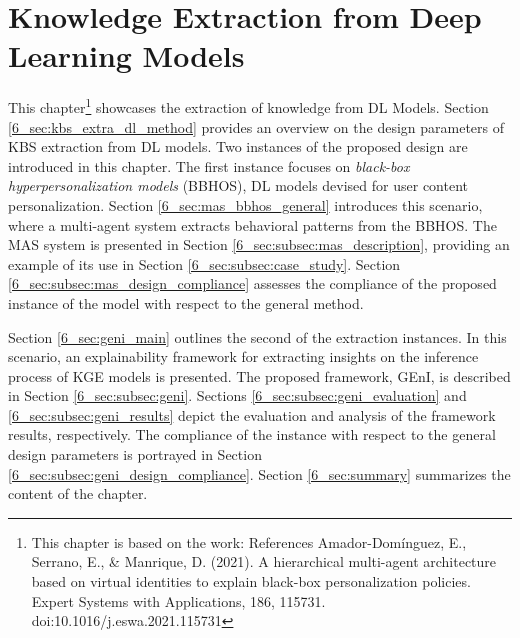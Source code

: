 \chapter{Knowledge Extraction from Deep Learning Models}
\label{chap:kbsextractiondl}
This chapter\footnote{This chapter is based on the work: References
Amador-Domínguez, E., Serrano, E., & Manrique, D. (2021). A hierarchical multi-agent architecture based on virtual identities to explain black-box personalization policies. Expert Systems with Applications, 186, 115731. doi:10.1016/j.eswa.2021.115731} showcases the extraction of knowledge from DL Models. Section \ref{6_sec:kbs_extra_dl_method} provides an overview on the design parameters of KBS extraction from DL models. Two instances of the proposed design are introduced in this chapter. The first instance focuses on \textit{black-box hyperpersonalization models} (BBHOS), DL models devised for user content personalization. Section \ref{6_sec:mas_bbhos_general} introduces this scenario, where a multi-agent system extracts behavioral patterns from the BBHOS. The MAS system is presented in Section \ref{6_sec:subsec:mas_description}, providing an example of its use in Section \ref{6_sec:subsec:case_study}. Section \ref{6_sec:subsec:mas_design_compliance} assesses the compliance of the proposed instance of the model with respect to the general method. 

Section \ref{6_sec:geni_main} outlines the second of the extraction instances. In this scenario, an explainability framework for extracting insights on the inference process of KGE models is presented. The proposed framework, GEnI, is described in Section \ref{6_sec:subsec:geni}. Sections \ref{6_sec:subsec:geni_evaluation} and \ref{6_sec:subsec:geni_results} depict the evaluation and analysis of the framework results, respectively. The compliance of the instance with respect to the general design parameters is portrayed in Section \ref{6_sec:subsec:geni_design_compliance}. Section \ref{6_sec:summary} summarizes the content of the chapter.


